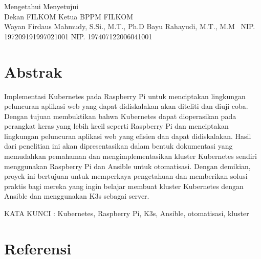 \documentclass[a4paper,12pt]{article}
\numberwithin{figure}{section}
\numberwithin{table}{section}
\begin{document}
\begin{flushleft}
Mengetahui \hspace{7.7cm} Menyetujui \\
Dekan FILKOM \hspace{6.85cm} Ketua BPPM FILKOM \\
\vspace{1.5cm}
Wayan Firdaus Mahmudy, S.Si., M.T., Ph.D \hspace{1.7cm} Bayu Rahayudi, M.T., M.M \
NIP. 197209191997021001 \hspace{6.05cm} NIP. 197407122006041001    
\end{flushleft}

\section*{Abstrak}
Implementasi Kubernetes pada Raspberry Pi untuk menciptakan lingkungan peluncuran aplikasi web yang dapat didiskalakan akan diteliti dan diuji coba. Dengan tujuan membuktikan bahwa Kubernetes dapat dioperasikan pada perangkat keras yang lebih kecil seperti Raspberry Pi dan menciptakan lingkungan peluncuran aplikasi web yang efisien dan dapat didiskalakan. Hasil dari penelitian ini akan dipresentasikan dalam bentuk dokumentasi yang memudahkan pemahaman dan mengimplementasikan kluster Kubernetes sendiri menggunakan Raspberry Pi dan Ansible untuk otomatisasi. Dengan demikian, proyek ini bertujuan untuk memperkaya pengetahuan dan memberikan solusi praktis bagi mereka yang ingin belajar membuat kluster Kubernetes dengan Ansible dan menggunakan K3s sebagai server.
\addcontentsline{toc}{section}{Abstrak}

\begin{flushleft}
KATA KUNCI : Kubernetes, Raspberry Pi, K3s, Ansible, otomatisasi, kluster 
\end{flushleft}
\newpage

\tableofcontents
\newpage
\listoffigures
\newpage
\listoftables
\newpage

% 
% 




\newpage
\section*{Referensi}
\printbibliography[heading=none]



\end{document}
